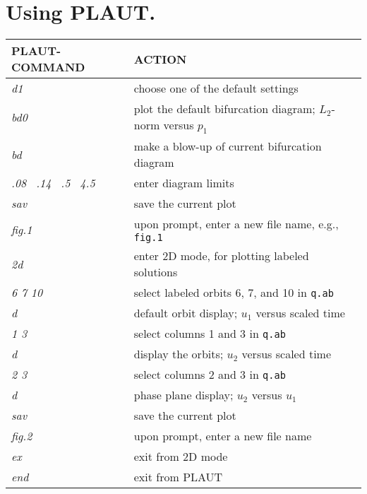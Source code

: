 \newpage
\section*{ Using {\sc PLAUT}.} 
\begin{table}[htbp]
\begin{center}
\begin{tabular}{| l | l |}
\hline
  {\sc PLAUT}-COMMAND  & ACTION \\
\hline
  {\it d1}  & choose one of the default settings\\ 
  {\it bd0}  & plot the default bifurcation diagram; $L_2$-norm versus $p_1$ \\ 
\hline
  {\it bd}  & make a blow-up of current bifurcation diagram \\ 
  {\it .08~ .14 ~.5~ 4.5} & enter diagram limits  \\
\hline
  {\it sav}  & save the current plot \\
  {\it fig.1}  & upon prompt, enter a new file name, e.g., {\tt fig.1} \\
\hline
  {\it 2d}  & enter 2D mode, for plotting labeled solutions\\ 
  {\it 6 7 10}  & select labeled orbits 6, 7, and 10 in {\tt q.ab}\\ 
  {\it d}  & default orbit display; $u_1$ versus scaled time\\
\hline
  {\it 1 3}  & select columns 1 and 3 in {\tt q.ab} \\
  {\it d}  & display the orbits; $u_2$ versus scaled time\\
\hline
  {\it 2 3}  & select columns 2 and 3 in {\tt q.ab} \\
  {\it d}  & phase plane display; $u_2$ versus $u_1$\\
\hline
  {\it sav}  & save the current plot \\
  {\it fig.2}  & upon prompt, enter a new file name \\
\hline
  {\it ex}  & exit from 2D mode  \\
  {\it end}  & exit from {\sc PLAUT} \\
\hline
\end{tabular}
\end{center}
\end{table}
\newpage

\begin{figure}[h]
\epsfysize 9.0cm
\centerline{}
\end{figure}
\newpage

\begin{figure}[h]
\epsfysize 9.0cm
\centerline{}
\end{figure}
\newpage


